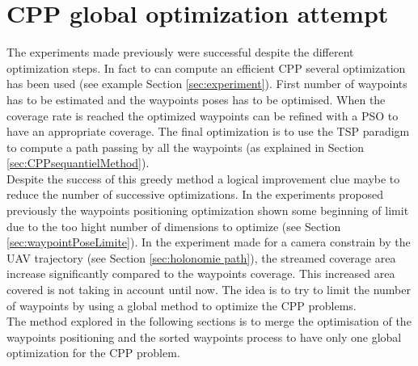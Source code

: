 \section{CPP global optimization attempt}

The experiments made previously were successful despite the different optimization steps. In fact to can compute an efficient CPP several optimization has been used (see example Section \ref{sec:experiment}). %
First number of waypoints has to be estimated and the waypoints poses has to be optimised. When the coverage rate is reached the optimized waypoints can be refined with a PSO to have an appropriate coverage. The final optimization is to use the TSP paradigm to compute a path passing by all the waypoints (as explained in Section \ref{sec:CPPsequantielMethod}). %
\\Despite the success of this greedy method a logical improvement clue maybe to reduce the number of successive optimizations. In the experiments proposed previously the waypoints positioning optimization shown some beginning of limit due to the too hight number of dimensions to optimize (see Section \ref{sec:waypointPoseLimite}). 
In the experiment made for a camera constrain by the UAV trajectory (see Section \ref{sec:holonomie path}), the streamed coverage area increase significantly compared to the waypoints coverage. This increased area covered is not taking in account until now. The idea is to try to limit the number of waypoints by using a global method to optimize the CPP problems.\\
The method explored in the following sections is to merge the optimisation of the waypoints positioning and the sorted waypoints process to have only one global optimization for the CPP problem. 
 
